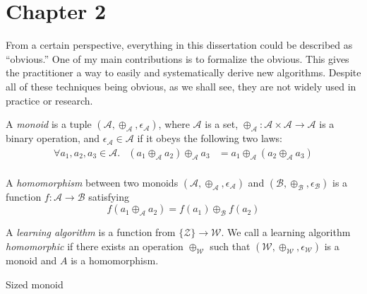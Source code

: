 \documentclass[thesis.tex]{subfiles}
\newcommand{\set}[1]{\mathcal {#1}}
\newcommand{\sized}[1]{\tilde \set {#1}}
\newcommand{\mappend}[1]{\oplus_{\set {#1}}}
\newcommand{\mempty}[1]{\epsilon_{\set {#1}}}
\newcommand{\monoid}[1]{(\set {#1}, \mappend {#1}, \mempty {#1})}
\begin{document}
\chapter{Chapter 2}

From a certain perspective, everything in this dissertation could be described as ``obvious.''
One of my main contributions is to formalize the obvious.
This gives the practitioner a way to easily and systematically derive new algorithms.
Despite all of these techniques being obvious,
as we shall see,
they are not widely used in practice or research.

\begin{definition}
    A \emph{monoid} is a tuple $(\set A, \mappend A, \mempty A)$,
    where $\set A$ is a set,
    $\mappend A : \set A \times \set A \to \set A$ is a binary operation,
    and $\mempty A \in \set A$ if it obeys the following two laws:
    \begin{align}
    \tag{associativity}
    \forall a_1, a_2, a_3 \in \set A. & (a_1 \mappend A a_2) \mappend A a_3 &= a_1 \mappend A (a_2 \mappend A a_3)
    \\
    \tag{identity}
    \end{align}
\end{definition}

\begin{definition}
    A \emph{homomorphism} between two monoids $\monoid A$ and $\monoid B$ is a function  $f: \set A \to \set B$ satisfying
    \begin{equation}
        f(a_1 \mappend A a_2) = f(a_1) \mappend B f(a_2)
    \end{equation}
\end{definition}

\begin{definition}
    A \emph{learning algorithm} is a function from $\{\set Z\} \to \set W$.
    We call a learning algorithm \emph{homomorphic} if there exists an operation $\mappend W$ such that $\monoid W$ is a monoid and $A$ is a homomorphism.
\end{definition}


\begin{example}
    Sized monoid
\end{example}
\end{document}
